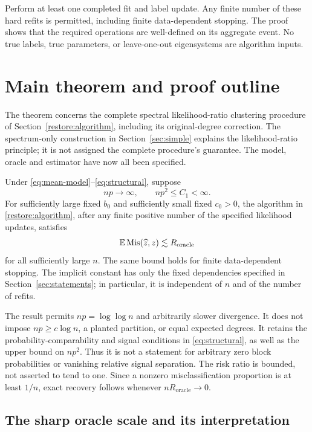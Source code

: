 Perform at least one completed fit and label update. Any finite number
of these hard refits is permitted, including finite data-dependent
stopping. The proof shows that the required operations are well-defined
on its aggregate event. No true labels, true parameters, or
leave-one-out eigensystems are algorithm inputs.

\section{Main theorem and proof outline}\label{sec:main-result}

The theorem concerns the complete spectral likelihood-ratio clustering
procedure of Section~\ref{restore:algorithm}, including its original-degree
correction. The spectrum-only construction in Section~\ref{sec:simple}
explains the likelihood-ratio principle; it is not assigned the complete
procedure's guarantee.
The model, oracle and estimator have now all been specified.

\begin{theorem}\label{restore:sbm-theorem}
Under \eqref{eq:mean-model}--\eqref{eq:structural}, suppose
\[
 np\longrightarrow\infty,\qquad np^2\le C_1<\infty.
\]
For sufficiently large fixed \(b_0\) and sufficiently small fixed
\(c_0>0\), the algorithm in
\cref{restore:algorithm}, after any finite positive number of the
specified likelihood updates, satisfies
\begin{equation}\label{eq:target}
 \mathbb E\operatorname{Mis}(\widehat z,z)\lesssim R_{\mathrm{oracle}}
\end{equation}
for all sufficiently large \(n\). The same bound holds for finite
data-dependent stopping. The implicit constant has only the fixed
dependencies specified in Section~\ref{sec:statements}; in particular,
it is independent of \(n\) and of the number of refits.
\end{theorem}

The result permits $np=\log\log n$ and arbitrarily slower
divergence. It does not impose $np\ge c\log n$, a planted partition,
or equal expected degrees. It retains the probability-comparability
and signal conditions in \eqref{eq:structural}, as well as the upper
bound on $np^2$. Thus it is not a statement for arbitrary zero
block probabilities or vanishing relative signal separation.
The risk ratio is bounded, not asserted to tend to one. Since a
nonzero misclassification proportion is at least $1/n$, exact
recovery follows whenever $nR_{\mathrm{oracle}}\to0$.


\subsection{The sharp oracle scale and its interpretation}\label{sec:oracle-scale}

